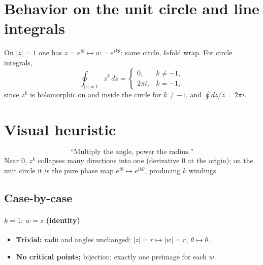 \documentclass[11pt]{article}
\begin{document}
\section*{Behavior on the unit circle and line integrals}
On $\lvert z\rvert=1$ one has $z=e^{i\theta}\mapsto w=e^{ik\theta}$: same circle, $k$-fold wrap.
For circle integrals,
\[
\oint_{\lvert z\rvert=1} z^{k}\,dz=
\begin{cases}
	0, & k\neq -1,\\[2pt]
	2\pi i, & k=-1,
\end{cases}
\]
since $z^{k}$ is holomorphic on and inside the circle for $k\neq -1$, and $\oint dz/z=2\pi i$.

\section*{Visual heuristic}
\[
\text{“Multiply the angle, power the radius.”}
\]
Near $0$, $z^{k}$ collapses many directions into one (derivative $0$ at the origin);
on the unit circle it is the pure phase map $e^{i\theta}\mapsto e^{ik\theta}$, producing $k$ windings.


\subsection*{Case-by-case}

\paragraph{\(k=1:\ w=z\) (identity)}
\begin{itemize}
	\item \textbf{Trivial:} radii and angles unchanged; \(|z|=r \mapsto |w|=r,\ \theta\mapsto\theta\).
	\item \textbf{No critical points;} bijection; exactly one preimage for each \(w\).
\end{itemize}
\end{document}
